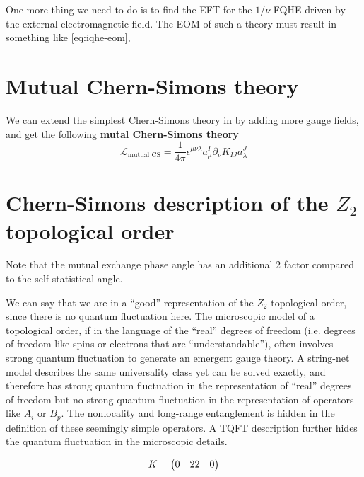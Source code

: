 \documentclass[hyperref, a4paper]{article}
\newcommand*{\concept}[1]{{\textbf{#1}}}
\def\\{}%
\def\mathbb#1{#1}%
\begin{document}
One more thing we need to do is to find the EFT for the $1 / \nu$ FQHE driven by the external electromagnetic field.
The EOM of such a theory must result in something like \eqref{eq:iqhe-eom}, 

\section{Mutual Chern-Simons theory}

We can extend the simplest Chern-Simons theory in  by adding more gauge fields, and get 
the following \concept{mutal Chern-Simons theory}
\begin{equation}
    \mathcal{L}_\text{mutual CS} = \frac{1}{4 \pi} \epsilon^{\mu \nu \lambda} a^I_\mu \partial_\nu K_{IJ} a^J_\lambda
\end{equation}

\section{Chern-Simons description of the $\mathbb{Z}_2$ topological order}


Note that the mutual exchange phase angle has an additional $2$ factor compared to the self-statistical angle. 

We can say that we are in a ``good'' representation of the $\mathbb{Z}_2$ topological order, since there is no 
quantum fluctuation here. The microscopic model of a topological order, if in the language of the ``real'' 
degrees of freedom (i.e. degrees of freedom like spins or electrons that are ``understandable''), often involves strong quantum fluctuation to generate an emergent gauge theory.
A string-net model describes the same universality class yet can be solved exactly, and therefore has 
strong quantum fluctuation in the representation of ``real'' degrees of freedom but no strong quantum 
fluctuation in the representation of operators like $A_i$ or $B_p$. The nonlocality and long-range entanglement 
is hidden in the definition of these seemingly simple operators. A TQFT description further hides the 
quantum fluctuation in the microscopic details.

\begin{equation}
    K = \pmqty{0 & 2 \\ 2 & 0}
\end{equation}
\end{document}
